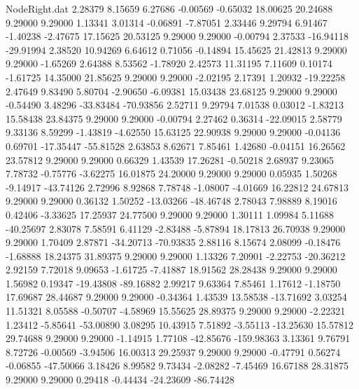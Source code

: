 \begin{filecontents}{NodeRight.dat}
   2.28379    8.15659    6.27686    -0.00569   -0.65032   18.00625   20.24688    9.29000    9.29000    1.13341    3.01314   -0.06891   -7.87051
   2.33446    9.29794    6.91467    -1.40238   -2.47675   17.15625   20.53125    9.29000    9.29000   -0.00794    2.37533  -16.94118  -29.91994
   2.38520   10.94269    6.64612     0.71056   -0.14894   15.45625   21.42813    9.29000    9.29000   -1.65269    2.64388    8.53562   -1.78920
   2.42573   11.31195    7.11609     0.10174   -1.61725   14.35000   21.85625    9.29000    9.29000   -2.02195    2.17391    1.20932  -19.22258
   2.47649    9.83490    5.80704    -2.90650   -6.09381   15.03438   23.68125    9.29000    9.29000   -0.54490    3.48296  -33.83484  -70.93856
   2.52711    9.29794    7.01538     0.03012   -1.83213   15.58438   23.84375    9.29000    9.29000   -0.00794    2.27462    0.36314  -22.09015
   2.58779    9.33136    8.59299    -1.43819   -4.62550   15.63125   22.90938    9.29000    9.29000   -0.04136    0.69701  -17.35447  -55.81528
   2.63853    8.62671    7.85461     1.42680   -0.04151   16.26562   23.57812    9.29000    9.29000    0.66329    1.43539   17.26281   -0.50218
   2.68937    9.23065    7.78732    -0.75776   -3.62275   16.01875   24.20000    9.29000    9.29000    0.05935    1.50268   -9.14917  -43.74126
   2.72996    8.92868    7.78748    -1.08007   -4.01669   16.22812   24.67813    9.29000    9.29000    0.36132    1.50252  -13.03266  -48.46748
   2.78043    7.98889    8.19016     0.42406   -3.33625   17.25937   24.77500    9.29000    9.29000    1.30111    1.09984    5.11688  -40.25697
   2.83078    7.58591    6.41129    -2.83488   -5.87894   18.17813   26.70938    9.29000    9.29000    1.70409    2.87871  -34.20713  -70.93835
   2.88116    8.15674    2.08099    -0.18476   -1.68888   18.24375   31.89375    9.29000    9.29000    1.13326    7.20901   -2.22753  -20.36212
   2.92159    7.72018    9.09653    -1.61725   -7.41887   18.91562   28.28438    9.29000    9.29000    1.56982    0.19347  -19.43808  -89.16882
   2.99217    9.63364    7.85461     1.17612   -1.18750   17.69687   28.44687    9.29000    9.29000   -0.34364    1.43539   13.58538  -13.71692
   3.03254   11.51321    8.05588    -0.50707   -4.58969   15.55625   28.89375    9.29000    9.29000   -2.22321    1.23412   -5.85641  -53.00890
   3.08295   10.43915    7.51892    -3.55113  -13.25630   15.57812   29.74688    9.29000    9.29000   -1.14915    1.77108  -42.85676 -159.98363
   3.13361    9.76791    8.72726    -0.00569   -3.94506   16.00313   29.25937    9.29000    9.29000   -0.47791    0.56274   -0.06855  -47.50066
   3.18426    8.99582    9.73434    -2.08282   -7.45469   16.67188   28.31875    9.29000    9.29000    0.29418   -0.44434  -24.23609  -86.74428

\end{filecontents}

